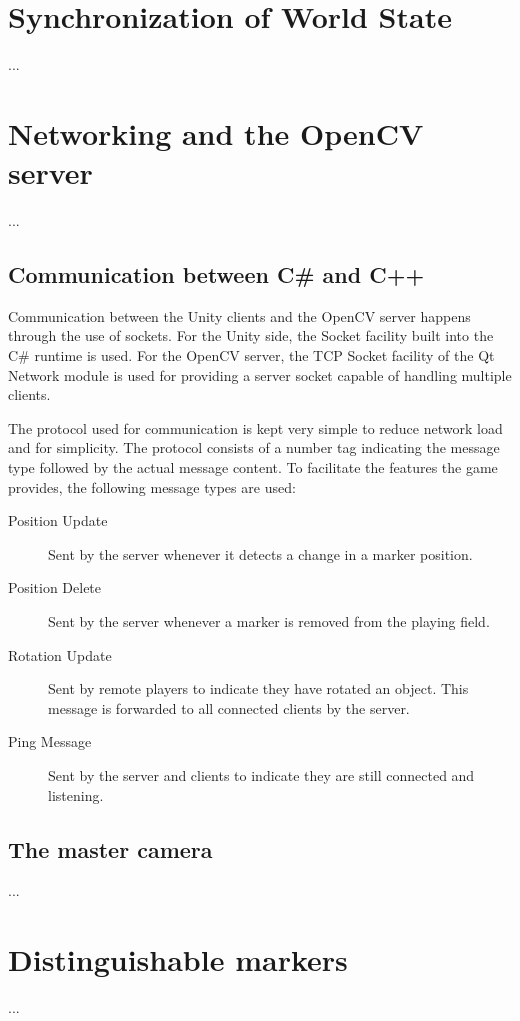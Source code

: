 	\section{Synchronization of World State} \label{sec:synchronization}
		...
		
	\section{Networking and the OpenCV server} \label{sec:network}
		...
		
		\subsection{Communication between C\# and C++} \label{ssec:communication}
			Communication between the Unity clients and the OpenCV server 
            happens through the use of sockets. For the Unity side, the Socket 
            facility built into the C\# runtime is used. For the OpenCV server, 
            the TCP Socket facility of the Qt Network module is used for 
            providing a server socket capable of handling multiple clients. 
            
            The protocol used for communication is kept very simple to reduce 
            network load and for simplicity. The protocol consists of a number
            tag indicating the message type followed by the actual message 
            content. To facilitate the features the game provides, the following
            message types are used:
            
            \begin{description}
                \item[Position Update] Sent by the server whenever it detects a 
                                       change in a marker position.
                \item[Position Delete] Sent by the server whenever a marker is
                                       removed from the playing field.
                \item[Rotation Update] Sent by remote players to indicate they 
                                       have rotated an object. This message is 
                                       forwarded to all connected clients by the
                                       server.
                \item[Ping Message]    Sent by the server and clients to indicate 
                                       they are still connected and listening.
            \end{description}
		
		\subsection{The master camera} \label{ssec:mastercamera}
			...
			
	\section{Distinguishable markers} \label{sec:markers}
		...